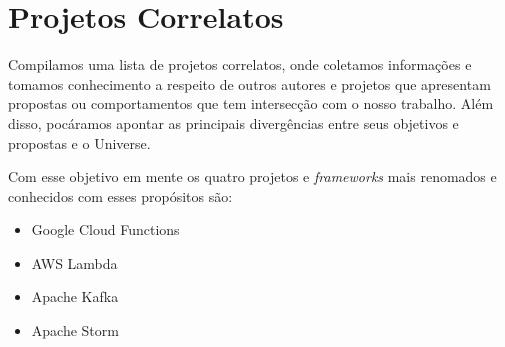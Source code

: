 \chapter{Projetos Correlatos}

Compilamos uma lista de projetos correlatos, onde coletamos informações e tomamos conhecimento a respeito de outros autores e projetos que apresentam propostas ou comportamentos que tem intersecção com o nosso trabalho. Além disso, pocáramos apontar as principais divergências entre seus objetivos e propostas e o Universe.
\bigskip

Com esse objetivo em mente os quatro projetos e \textit{frameworks} mais renomados e conhecidos com esses propósitos são:
\begin{itemize}
	\item Google Cloud Functions
	\item AWS Lambda
	\item Apache Kafka
	\item Apache Storm
\end{itemize}







